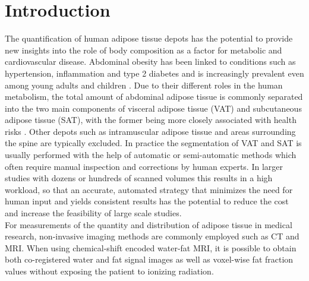 \documentclass[10pt,letterpaper]{article}
\begin{document}
	\section*{Introduction}
	The quantification of human adipose tissue depots has the potential to provide new insights into the role of body composition as a factor for metabolic and cardiovascular disease. Abdominal obesity has been linked to conditions such as hypertension, inflammation and type 2 diabetes and is increasingly prevalent even among young adults and children \cite{despres2006abdominal}. Due to their different roles in the human metabolism, the total amount of abdominal adipose tissue is commonly separated into the two main components of visceral adipose tissue (VAT) and subcutaneous adipose tissue (SAT), with the former being more closely associated with health risks \cite{hu2016segmentation}. Other depots such as intramuscular adipose tissue and areas surrounding the spine are typically excluded. In practice the segmentation of VAT and SAT is usually performed with the help of automatic or semi-automatic methods which often require manual inspection and corrections by human experts. In larger studies with dozens or hundreds of scanned volumes this results in a high workload, so that an accurate, automated strategy that minimizes the need for human input and yields consistent results has the potential to reduce the cost and increase the feasibility of large scale studies.\\

	For measurements of the quantity and distribution of adipose tissue in medical research, non-invasive imaging methods are commonly employed such as CT and MRI. When using chemical-shift encoded water-fat MRI, it is possible to obtain both co-registered water and fat signal images as well as voxel-wise fat fraction values \cite{hu2013quantitative} without exposing the patient to ionizing radiation.
\end{document}
